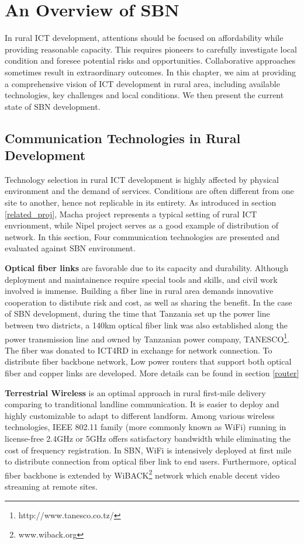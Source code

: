 \chapter{An Overview of SBN}
In rural ICT development, attentions should be focused on affordability while providing reasonable capacity. This requires pioneers to carefully investigate local condition and foresee potential risks and opportunities. Collaborative approaches sometimes result in extraordinary outcomes. In this chapter, we aim at providing a comprehensive vision of ICT development in rural area, including available technologies, key challenges and local conditions. We then present the current state of SBN development.

\section{Communication Technologies in Rural Development}
Technology selection in rural ICT development is highly affected by physical environment and the demand of services. Conditions are often different from one site to another, hence not replicable in its entirety. As introduced in section \ref{related_proj}, Macha project represents a typical setting of rural ICT envrionment, while Nipel project serves as a good example of distribution of network. In this section, Four communication technologies are presented and evaluated against SBN environment.

\textbf{Optical fiber links} are favorable due to its capacity and durability. Although deployment and maintainence require special tools and skills, and civil work involved is immense. Building a fiber line in rural area demands innovative cooperation to distibute risk and cost, as well as sharing the benefit. In the case of SBN development, during the time that Tanzania set up the power line between two districts, a 140km optical fiber link was also established along the power transmission line and owned by Tanzanian power company, TANESCO\footnote{http://www.tanesco.co.tz/}. The fiber was donated to ICT4RD in exchange for network connection. To distribute fiber backbone network, Low power routers that support both optical fiber and copper links are developed. More details can be found in section \ref{router}

\textbf{Terrestrial Wireless} is an optimal approach in rural first-mile delivery comparing to tranditional landline communication. It is easier to deploy and highly customizable to adapt to different landform. Among various wireless technologies, IEEE 802.11 family (more commonly known as WiFi) running in license-free 2.4GHz or 5GHz offers satisfactory bandwidth while eliminating the cost of frequency registration. In SBN, WiFi is intensively deployed at first mile to distribute connection from optical fiber link to end users. Furthermore, optical fiber backbone is extended by WiBACK\footnote{www.wiback.org} network which enable decent video streaming at remote sites.

